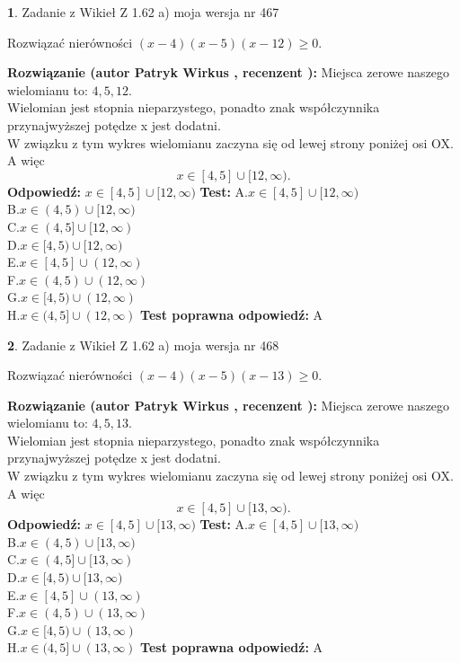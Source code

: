 \documentclass[12pt, a4paper]{article}
\theoremstyle{definition} %
\newtheorem{zad}{}
\newcommand{\zadStart}[1]{\begin{zad}#1\newline}
\newcommand{\zadStop}{\end{zad}}
\newcommand{\rozwStart}[2]{\noindent \textbf{Rozwiązanie (autor #1 , recenzent #2): }\newline}
\newcommand{\rozwStop}{\newline}
\newcommand{\odpStart}{\noindent \textbf{Odpowiedź:}\newline}
\newcommand{\odpStop}{\newline}
\newcommand{\testStart}{\noindent \textbf{Test:}\newline}
\newcommand{\testStop}{\newline}
\newcommand{\kluczStart}{\noindent \textbf{Test poprawna odpowiedź:}\newline}
\newcommand{\kluczStop}{\newline}
\begin{document}
\zadStart{Zadanie z Wikieł Z 1.62 a) moja wersja nr 467}

Rozwiązać nierówności $(x-4)(x-5)(x-12)\ge0$.
\zadStop
\rozwStart{Patryk Wirkus}{}
Miejsca zerowe naszego wielomianu to: $4, 5, 12$.\\
Wielomian jest stopnia nieparzystego, ponadto znak współczynnika przy\linebreak najwyższej potędze x jest dodatni.\\ W związku z tym wykres wielomianu zaczyna się od lewej strony poniżej osi OX. A więc $$x \in [4,5] \cup [12,\infty).$$
\rozwStop
\odpStart
$x \in [4,5] \cup [12,\infty)$
\odpStop
\testStart
A.$x \in [4,5] \cup [12,\infty)$\\
B.$x \in (4,5) \cup [12,\infty)$\\
C.$x \in (4,5] \cup [12,\infty)$\\
D.$x \in [4,5) \cup [12,\infty)$\\
E.$x \in [4,5] \cup (12,\infty)$\\
F.$x \in (4,5) \cup (12,\infty)$\\
G.$x \in [4,5) \cup (12,\infty)$\\
H.$x \in (4,5] \cup (12,\infty)$
\testStop
\kluczStart
A
\kluczStop



\zadStart{Zadanie z Wikieł Z 1.62 a) moja wersja nr 468}

Rozwiązać nierówności $(x-4)(x-5)(x-13)\ge0$.
\zadStop
\rozwStart{Patryk Wirkus}{}
Miejsca zerowe naszego wielomianu to: $4, 5, 13$.\\
Wielomian jest stopnia nieparzystego, ponadto znak współczynnika przy\linebreak najwyższej potędze x jest dodatni.\\ W związku z tym wykres wielomianu zaczyna się od lewej strony poniżej osi OX. A więc $$x \in [4,5] \cup [13,\infty).$$
\rozwStop
\odpStart
$x \in [4,5] \cup [13,\infty)$
\odpStop
\testStart
A.$x \in [4,5] \cup [13,\infty)$\\
B.$x \in (4,5) \cup [13,\infty)$\\
C.$x \in (4,5] \cup [13,\infty)$\\
D.$x \in [4,5) \cup [13,\infty)$\\
E.$x \in [4,5] \cup (13,\infty)$\\
F.$x \in (4,5) \cup (13,\infty)$\\
G.$x \in [4,5) \cup (13,\infty)$\\
H.$x \in (4,5] \cup (13,\infty)$
\testStop
\kluczStart
A
\kluczStop
\end{document}
